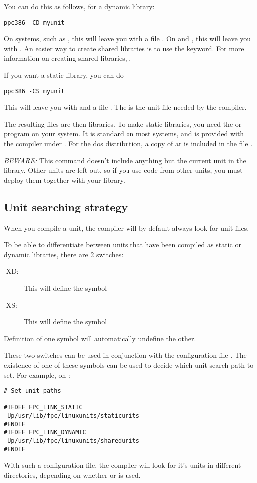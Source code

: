 You can do this as follows, for a dynamic library:
\begin{verbatim}
ppc386 -CD myunit
\end{verbatim}
On \unix systems, such as \linux, this will leave you with a file . On \windows
and \ostwo, this will leave you with . An easier way to
create shared libraries is to use the  keyword. For more
information on creating shared libraries, .

If you want a static library, you can do
\begin{verbatim}
ppc386 -CS myunit
\end{verbatim}
This will leave you with  and a file .
The  is the unit file needed by the \fpc compiler.

The resulting files are then libraries. To make static libraries, you need
the  or  program on your system. It is standard on most
\unix systems, and is provided with the  compiler under \dos.
For the dos distribution, a copy of ar is included in the file
.

{\em BEWARE:} This command doesn't include anything but the current unit in
the library. Other units are left out, so if you use code from other units,
you must deploy them together with your library.


\subsection{Unit searching strategy}

When you compile a unit, the compiler will by
default always look for unit files.

To be able to differentiate between units that have been compiled as static
or dynamic libraries, there are 2 switches:

\begin{description}
\item [-XD:\ ] This will define the symbol 
\item [-XS:\ ] This will define the symbol 
\end{description}
Definition of one symbol will automatically undefine the other.

These two switches can be used in conjunction with the configuration file
. The existence of one of these symbols can be used to
decide which unit search path to set. For example, on \linux:
\begin{verbatim}
# Set unit paths

#IFDEF FPC_LINK_STATIC
-Up/usr/lib/fpc/linuxunits/staticunits
#ENDIF
#IFDEF FPC_LINK_DYNAMIC
-Up/usr/lib/fpc/linuxunits/sharedunits
#ENDIF
\end{verbatim}
With such a configuration file, the compiler will look for it's units in
different directories, depending on whether  or  is used.

